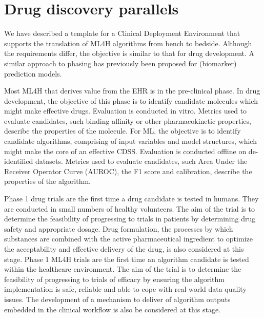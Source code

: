 \hypertarget{drug-discovery-parallels}{%
\section{Drug discovery parallels}\label{drug-discovery-parallels}}

We have described a template for a Clinical Deployment Environment that
supports the translation of ML4H algorithms from bench to bedside.
Although the requirements differ, the objective is similar to that for
drug development. A similar approach to phasing has previously been
proposed for (biomarker) prediction models.\citep{pepe2001}

Most ML4H that derives value from the EHR is in the pre-clinical phase.
In drug development, the objective of this phase is to identify
candidate molecules which might make effective drugs. Evaluation is
conducted in vitro. Metrics used to evaluate candidates, such binding
affinity or other pharmacokinetic properties, describe the properties of
the molecule.\citep{lo2018} For ML, the objective is to identify
candidate algorithms, comprising of input variables and model
structures, which might make the core of an effective CDSS. Evaluation
is conducted offline on de-identified datasets. Metrics used to evaluate
candidates, such Area Under the Receiver Operator Curve (AUROC), the F1
score and calibration, describe the properties of the
algorithm.\citep{collins2015}

Phase 1 drug trials are the first time a drug candidate is tested in
humans. They are conducted in small numbers of healthy volunteers. The
aim of the trial is to determine the feasibility of progressing to
trials in patients by determining drug safety and appropriate dosage.
Drug formulation, the processes by which substances are combined with
the active pharmaceutical ingredient to optimize the acceptability and
effective delivery of the drug, is also considered at this stage. Phase
1 ML4H trials are the first time an algorithm candidate is tested within
the healthcare environment. The aim of the trial is to determine the
feasibility of progressing to trials of efficacy by ensuring the
algorithm implementation is safe, reliable and able to cope with
real-world data quality issues. The development of a mechanism to
deliver of algorithm outputs embedded in the clinical workflow is also
be considered at this stage.

